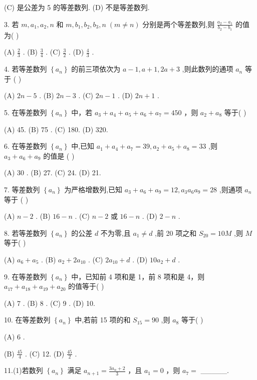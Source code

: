 \documentclass[10pt]{article}
\begin{document}
(C) 是公差为 5 的等差数列. (D) 不是等差数列.

3. 若 \(m,{a}_{1},{a}_{2},n\) 和 \(m,{b}_{1},{b}_{2},{b}_{3},n\;\left( {m \neq  n}\right)\) 分别是两个等差数列,则 \(\frac{{a}_{2} - {a}_{1}}{{b}_{2} - {b}_{1}}\) 的值为( )

(A) \(\frac{2}{3}\) . (B) \(\frac{3}{4}\) . (C) \(\frac{3}{2}\) . (D) \(\frac{4}{3}\) .

4. 若等差数列 \(\left\{  {a}_{n}\right\}\) 的前三项依次为 \(a - 1,a + 1,{2a} + 3\) ,则此数列的通项 \({a}_{n}\) 等于 ( )

(A) \({2n} - 5\) . (B) \({2n} - 3\) . (C) \({2n} - 1\) . (D) \({2n} + 1\) .

5. 在等差数列 \(\left\{  {a}_{n}\right\}\) 中，若 \({a}_{3} + {a}_{4} + {a}_{5} + {a}_{6} + {a}_{7} = {450}\) ，则 \({a}_{2} + {a}_{8}\) 等于( )

(A) 45. (B) 75 . (C) 180. (D) 320.

6. 在等差数列 \(\left\{  {a}_{n}\right\}\) 中,已知 \({a}_{1} + {a}_{4} + {a}_{7} = {39},{a}_{2} + {a}_{5} + {a}_{8} = {33}\) ,则 \({a}_{3} + {a}_{6} + {a}_{9}\) 的值是 ( )

(A) 30 . (B) 27. (C) 24. (D) 21.

7. 等差数列 \(\left\{  {a}_{n}\right\}\) 为严格增数列,已知 \({a}_{3} + {a}_{6} + {a}_{9} = {12},{a}_{3}{a}_{6}{a}_{9} = {28}\) ,则通项 \({a}_{n}\) 等于 ( )

(A) \(n - 2\) . (B) \({16} - n\) . (C) \(n - 2\) 或 \({16} - n\) . (D) \(2 - n\) .

8. 若等差数列 \(\left\{  {a}_{n}\right\}\) 的公差 \(d\) 不为零,且 \({a}_{1} \neq  d\) ,前 20 项之和 \({S}_{20} = {10M}\) ,则 \(M\) 等于( )

(A) \({a}_{6} + {a}_{5}\) . (B) \({a}_{2} + 2{a}_{10}\) . (C) \(2{a}_{10} + d\) . (D) \({10}{a}_{2} + d\) .

9. 在等差数列 \(\left\{  {a}_{n}\right\}\) 中，已知前 4 项和是 1，前 8 项和是 4，则 \({a}_{17} + {a}_{18} + {a}_{19} + {a}_{20}\) 的值等于( )

(A) 7 . (B) 8 . (C) 9 . (D) 10.

10. 在等差数列 \(\left\{  {a}_{n}\right\}\) 中,若前 15 项的和 \({S}_{15} = {90}\) ,则 \({a}_{8}\) 等于( )

(A) 6 .

(B) \(\frac{45}{4}\) . (C) 12. (D) \(\frac{45}{2}\) .

11.(1)若数列 \(\left\{  {a}_{n}\right\}\) 满足 \({a}_{n + 1} = \frac{{3{a}_{n}} + 2}{3}\) ，且 \({a}_{1} = 0\) ，则 \({a}_{7} =\) \_\_\_\_\_.
\end{document}

